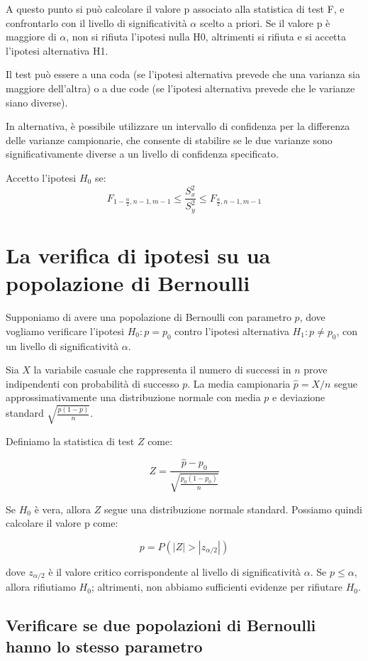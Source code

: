A questo punto si può calcolare il valore p associato alla statistica di test F, e confrontarlo con il livello di significatività $\alpha$ scelto a priori. Se il valore p è maggiore di $\alpha$, non si rifiuta l'ipotesi nulla H0, altrimenti si rifiuta e si accetta l'ipotesi alternativa H1.

Il test può essere a una coda (se l'ipotesi alternativa prevede che una varianza sia maggiore dell'altra) o a due code (se l'ipotesi alternativa prevede che le varianze siano diverse).

In alternativa, è possibile utilizzare un intervallo di confidenza per la differenza delle varianze campionarie, che consente di stabilire se le due varianze sono significativamente diverse a un livello di confidenza specificato.

Accetto l'ipotesi $H_0$ se:
\begin{equation}
  F_{1- \frac{\alpha}{2}, n-1, m-1} \leq \frac{S^2_x}{S^2_y} \leq F_{\frac{\alpha}{2}, n-1, m-1}
\end{equation}

\section{La verifica di ipotesi su ua popolazione di Bernoulli}

Supponiamo di avere una popolazione di Bernoulli con parametro $p$, dove vogliamo verificare l'ipotesi $H_0: p=p_0$ contro l'ipotesi alternativa $H_1: p \neq p_0$, con un livello di significatività $\alpha$.

Sia $X$ la variabile casuale che rappresenta il numero di successi in $n$ prove indipendenti con probabilità di successo $p$. La media campionaria $\hat{p} = X/n$ segue approssimativamente una distribuzione normale con media $p$ e deviazione standard $\sqrt{\frac{p(1-p)}{n}}$.

Definiamo la statistica di test $Z$ come:

$$Z = \frac{\hat{p}-p_0}{\sqrt{\frac{p_0(1-p_0)}{n}}}$$

Se $H_0$ è vera, allora $Z$ segue una distribuzione normale standard. Possiamo quindi calcolare il valore p come:

$$p = P(|Z| > |z_{\alpha/2}|)$$

dove $z_{\alpha/2}$ è il valore critico corrispondente al livello di significatività $\alpha$. Se $p \leq \alpha$, allora rifiutiamo $H_0$; altrimenti, non abbiamo sufficienti evidenze per rifiutare $H_0$.

\subsection{Verificare se due popolazioni di Bernoulli hanno lo stesso parametro}


